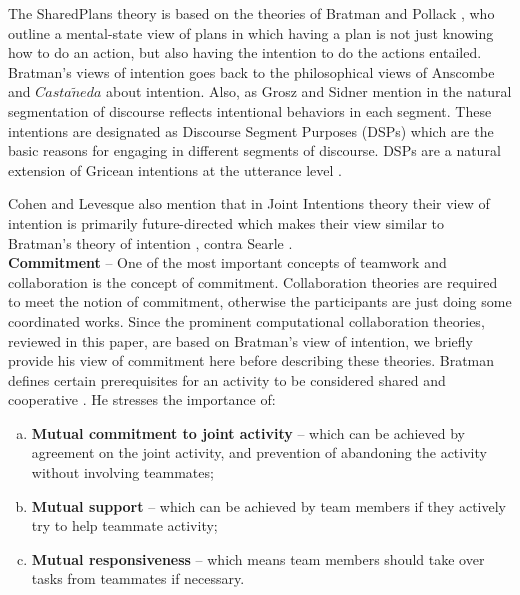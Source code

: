 \documentclass[12pt]{report}
\begin{document}
The SharedPlans theory is based on the theories of Bratman and Pollack
\cite{bratman:plans-reasoning,pollack:plan-inference,
pollack:plan-mental-attitudes}, who outline a mental-state view of plans in
which having a plan is not just knowing how to do an action, but also having the
intention to do the actions entailed. Bratman's views of intention goes back to
the philosophical views of Anscombe \cite{anscombe:intention} and
$Casta\tilde{n}eda$ \cite{castaneda:thinking} about intention. Also, as Grosz
and Sidner mention in \cite{grosz:plans-discourse} the natural segmentation of
discourse reflects intentional behaviors in each segment. These intentions are
designated as Discourse Segment Purposes (DSPs) which are the basic reasons for
engaging in different segments of discourse. DSPs are a natural extension of
Gricean intentions at the utterance level \cite{neale:grice-language}.

Cohen and Levesque also mention that in Joint Intentions theory their view of
intention is primarily future-directed \cite{cohen:intention-commitment} which
makes their view similar to Bratman's theory of intention
\cite{bratman:intention}, contra Searle \cite{searle:collective}.\\

\textbf{Commitment} -- One of the most important concepts of teamwork and
collaboration is the concept of commitment. Collaboration theories are required
to meet the notion of commitment, otherwise the participants are just doing some
coordinated works. Since the prominent computational collaboration theories,
reviewed in this paper, are based on Bratman's view of intention, we briefly
provide his view of commitment here before describing these theories. Bratman
defines certain prerequisites for an activity to be considered shared and
cooperative \cite{bratman:shared-activity}. He stresses the importance of:

\begin{enumerate}[a)]
  \item \textbf{Mutual commitment to joint activity} -- which can be achieved by
  agreement on the joint activity, and prevention of abandoning the activity
  without involving teammates;
  \item \textbf{Mutual support} -- which can be achieved by team members
  if they actively try to help teammate activity;
  \item \textbf{Mutual responsiveness} -- which means team members should take
  over tasks from teammates if necessary.
\end{enumerate}
\end{document}

